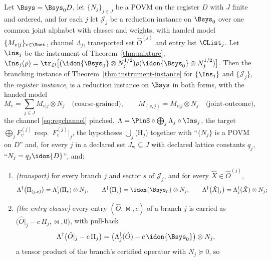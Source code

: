 \begin{corollary}\label{cor:register-instance}
Let $\Bsys=\Bsys_0D$, let $\{N_j\}_{j\in J}$ be a POVM on the register $D$
with $J$ finite and ordered, and for each $j$ let $\mathcal{J}_j$ be a
reduction instance on $\Bsys_0$ over one common joint alphabet with classes
and weights, with handed model $\{M_{v|j}\}_{v\in\Vset}$, channel
$\Lambda_j$, transported set $\hat O^{(j)}$ and entry list $\CList_j$. Let
$\Ins_j$ be the instrument of Theorem~\ref{thm:mixture},
$\Ins_j(\rho)=\tr_{D}\big[(\idon{\Bsys_0}\otimes N_j^{1/2})\rho
(\idon{\Bsys_0}\otimes N_j^{1/2})\big]$. Then the branching instance of
Theorem~\ref{thm:instrument-instance} for $\{\Ins_j\}$ and
$\{\mathcal{J}_j\}$, the \emph{register instance}, is a reduction
instance on $\Bsys$ in both forms, with the handed model
\begin{equation}\label{eq:register-model}
  M_v=\sum_{j\in J}M_{v|j}\otimes N_j
  \quad\text{(coarse-grained)},
  \qquad
  M_{(v,j)}=M_{v|j}\otimes N_j
  \quad\text{(joint-outcome)},
\end{equation}
the channel \eqref{eq:regchannel} pinched,
$\Lambda=\PinS\circ\bigoplus_j\Lambda_j\circ\Ins_j$, the target
$\bigoplus_jF^{(j)}_v$ resp.\ $F^{(j)}_v|_j$, the hypotheses
$\bigcup_j$(H$_j$) together with ``$\{N_j\}$ is a POVM on $D$'' and, for every
$j$ in a declared set $J_{\mathrm{w}}\subseteq J$ with declared lattice
constants $q_j$, ``$N_j=q_j\idon{D}$'', and:
\begin{enumerate}[label=(\roman*),leftmargin=3.0em]
\item \emph{(transport)} for every branch $j$ and sector $s$ of
  $\mathcal{J}_j$, and for every $\hat X\in\hat O^{(j)}$,
  \begin{equation}\label{eq:register-transport}
    \Lambda^{\dagger}\big(\Pi_{(j,s)}\big)=\Lambda_j^{\dagger}(\Pi_s)\otimes N_j,
    \qquad
    \Lambda^{\dagger}\big(\Pi_j\big)=\idon{\Bsys_0}\otimes N_j,
    \qquad
    \Lambda^{\dagger}\big(\hat X|_j\big)=\Lambda_j^{\dagger}(\hat X)\otimes N_j ;
  \end{equation}
\item \emph{(the entry clause)} every entry $(\hat O,\bowtie,c)$ of a branch
  $j$ is carried as $\big(\hat O|_j-c\,\Pi_j,\bowtie,0\big)$, with pull-back
  \begin{equation}\label{eq:register-entry}
    \Lambda^{\dagger}\big(\hat O|_j-c\,\Pi_j\big)
    =\big(\Lambda_j^{\dagger}(\hat O)-c\,\idon{\Bsys_0}\big)\otimes N_j ,
  \end{equation}
  a tensor product of the branch's certified operator with $N_j\succeq0$, so

\end{enumerate}
\end{corollary}
